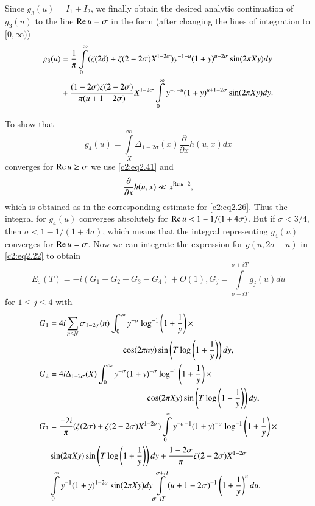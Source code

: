 Since $g_3 (u) = I_1 + I_2$, we finally obtain the desired analytic
continuation of $g_3 (u)$ to the line $\operatorname{Re} u= \sigma$ in the form
(after changing the lines of integration to $[0, \infty)$)
\begin{align}
  g_3 (u) & = \frac{1}{\pi} \int\limits_0^\infty (\zeta (2 \delta) +
  \zeta (2 - 2 \sigma) X^{1- 2 \sigma}) y^{-1-u} (1+ y)^{u-2 \sigma}
  \sin (2 \pi Xy) dy\notag\\
  & + \frac{(1- 2 \sigma) \zeta (2- 2\sigma)}{\pi (u + 1- 2 \sigma)}
  X^{1-2 \sigma} \int\limits^\infty_0 y^{-1-u} (1+y)^{u+1 - 2 \sigma}
  \sin (2 \pi Xy)dy.\label{c2:eq2.43}
\end{align}

To show that
$$
g_4 (u) = \int\limits_X^\infty \Delta _{1- 2 \sigma} (x)
\frac{\partial}{\partial x} h(u, x)dx
$$
converges for $\operatorname{Re} u \geq \sigma$ we use \eqref{c2:eq2.41} and 
$$
\frac{\partial}{\partial x} h (u, x) \ll x^{\operatorname{Re} u-2},
$$
which is obtained as in the corresponding estimate for
\eqref{c2:eq2.26}. Thus the integral for $g_4 (u)$ converges
absolutely for $\operatorname{Re} u < 1 - 1/(1+ 4 \sigma)$. But if $\sigma < 3/4$,
then $\sigma < 1 - 1 / (1+ 4 \sigma)$, which means that the integral
representing $g_4 (u)$ converges for $\operatorname{Re} u = \sigma$. Now we can
integrate the expression for $g(u , 2 \sigma- u)$ in \eqref{c2:eq2.22}
to obtain 
\begin{equation}
  E_\sigma (T) =- i (G_1 - G_2 + G_3 - G_4) + O(1), G_j =
  \int\limits_{\sigma - iT}^{\sigma + iT} g_j (u) du\label{c2:eq2.44}
\end{equation}
for $1 \leq j \leq 4$ with
\begin{align}
  G_1 & = 4i \sum_{n \leq N} \sigma_{1- 2 \sigma} (n) \int^\infty_0 y^{-
  \sigma} \log^{-1} \left(1 + \frac{1}{y} \right)\times\notag\\ 
  & \hspace{3cm}\cos (2 \pi n y)
  \sin \left(T \log \left(1+ \frac{1}{y}\right)\right) dy,\label{c2:eq2.45}\\
  G_2 & = 4 i \Delta _{1- 2 \sigma}(X) \int_0^\infty y^{- \sigma}
  (1+ y)^{- \sigma} \log^{-1} \left( 1 +
  \frac{1}{y}\right)\times\notag\\ 
  & \hspace{4cm}\cos (2 \pi Xy) \sin \left(T \log \left(1+
  \frac{1}{y} \right)\right) dy,\label{c2:eq2.46}\\
  G_3 & = \frac{- 2 i}{\pi} (\zeta (2 \sigma)+ \zeta (2- 2
  \sigma)X^{1-2 \sigma}) \int\limits_0^\infty y^{- \sigma-1} (1+ y)^{-
  \sigma} \log^{-1} \left(1+ \frac{1}{y} \right)\times\notag\\ 
  & \sin (2 \pi Xy) \sin
  \left(T \log \left(1+ \frac{1}{y}\right)\right)dy
   + \frac{1- 2 \sigma}{\pi} \zeta (2 - 2 \sigma)X^{1-2
     \sigma}\label{c2:eq2.47}\\ 
  & \int\limits_0^\infty y^{-1} (1+y)^{1-2\sigma} \sin (2 \pi Xy)dy
  \int\limits_{\sigma- i T}^{\sigma + iT} (u+1 - 2 \sigma)^{-1}
  \left(1+ \frac{1}{y} \right)^u du.\notag
\end{align}

